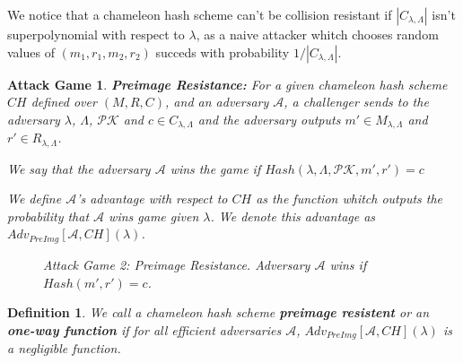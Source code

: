 \documentclass[a4paper]{article}
\newtheorem{definicao}{Definition}
\newtheorem{game}{Attack Game}
\begin{document}
 We notice that a chameleon hash scheme can't be collision resistant if
 $|C_{\lambda,\Lambda}|$ isn't superpolynomial with respect to
 $\lambda$, as
 a naive attacker whitch chooses random values of $(m_1, r_1, m_2,
 r_2)$ succeds with probability $1/|C_{\lambda,\Lambda}|$.
 
 \begin{game}
 \textbf{Preimage Resistance: }For a given chameleon hash scheme $CH$
 defined over $(M, R, C)$, and an adversary $\mathcal{A}$,
 a challenger sends to the adversary $\lambda$, $\Lambda$,
 $\mathcal{PK}$ and $c \in C_{\lambda,\Lambda}$ and the adversary
 outputs $m' \in M_{\lambda,\Lambda}$ and $r' \in R_{\lambda,\Lambda}$.
 
 We say that the adversary $\mathcal{A}$ wins the game if
 $Hash(\lambda, \Lambda, \mathcal{PK}, m', r') = c$
 
 We define $\mathcal{A}$'s advantage with respect to $CH$ as the
 function whitch outputs the probability that $\mathcal{A}$ wins 
 game given $\lambda$. We denote this advantage as
 $Adv_{PreImg}[\mathcal{A},CH](\lambda)$.
 
 \begin{figure}
 \centering
 \caption{Attack Game 2: Preimage Resistance. Adversary $\mathcal{A}$ wins if $Hash(m', r')=c$.}
 \end{figure}
 \end{game}
 
 \begin{definicao}
 We call a chameleon hash scheme \textbf{preimage resistent} 
 or an \textbf{one-way function} if for all efficient adversaries
 $\mathcal{A}$, $Adv_{PreImg}[\mathcal{A},CH](\lambda)$ is a negligible
 function.
 \end{definicao}
 
\end{document}
